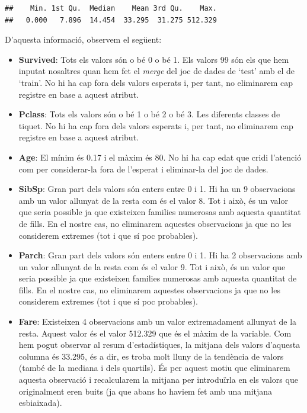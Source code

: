 \documentclass[
]{article}
\newenvironment{Shaded}{\begin{snugshade}}{\end{snugshade}}
\newcommand{\FunctionTok}[1]{\textcolor[rgb]{0.94,0.94,0.56}{#1}}
\newcommand{\NormalTok}[1]{\textcolor[rgb]{0.80,0.80,0.80}{#1}}
\newcommand{\SpecialCharTok}[1]{\textcolor[rgb]{0.86,0.64,0.64}{#1}}
\begin{document}
\begin{Shaded}
\end{Shaded}

\begin{verbatim}
##    Min. 1st Qu.  Median    Mean 3rd Qu.    Max. 
##   0.000   7.896  14.454  33.295  31.275 512.329
\end{verbatim}

D'aquesta informació, observem el següent:

\begin{itemize}
\item
  \textbf{Survived}: Tots els valors són o bé 0 o bé 1. Els valors 99
  són els que hem inputat nosaltres quan hem fet el \emph{merge} del joc
  de dades de `test' amb el de `train'. No hi ha cap fora dels valors
  esperats i, per tant, no eliminarem cap registre en base a aquest
  atribut.
\item
  \textbf{Pclass}: Tots els valors són o bé 1 o bé 2 o bé 3. Les
  diferents classes de tiquet. No hi ha cap fora dels valors esperats i,
  per tant, no eliminarem cap registre en base a aquest atribut.
\item
  \textbf{Age}: El mínim és 0.17 i el màxim és 80. No hi ha cap edat que
  cridi l'atenció com per considerar-la fora de l'esperat i eliminar-la
  del joc de dades.
\item
  \textbf{SibSp}: Gran part dels valors són enters entre 0 i 1. Hi ha un
  9 observacions amb un valor allunyat de la resta com és el valor 8.
  Tot i això, és un valor que seria possible ja que existeixen families
  numerosas amb aquesta quantitat de fills. En el nostre cas, no
  eliminarem aquestes observacions ja que no les considerem extremes
  (tot i que sí poc probables).
\item
  \textbf{Parch}: Gran part dels valors són enters entre 0 i 1. Hi ha 2
  observacions amb un valor allunyat de la resta com és el valor 9. Tot
  i això, és un valor que seria possible ja que existeixen families
  numerosas amb aquesta quantitat de fills. En el nostre cas, no
  eliminarem aquestes observacions ja que no les considerem extremes
  (tot i que sí poc probables).
\item
  \textbf{Fare}: Existeixen 4 observacions amb un valor extremadament
  allunyat de la resta. Aquest valor és el valor 512.329 que és el màxim
  de la variable. Com hem pogut observar al resum d'estadístiques, la
  mitjana dels valors d'aquesta columna és 33.295, és a dir, es troba
  molt lluny de la tendència de valors (també de la mediana i dels
  quartils). És per aquest motiu que eliminarem aquesta observació i
  recalcularem la mitjana per introduïrla en els valors que originalment
  eren buits (ja que abans ho haviem fet amb una mitjana esbiaixada).
\end{itemize}
\end{document}

